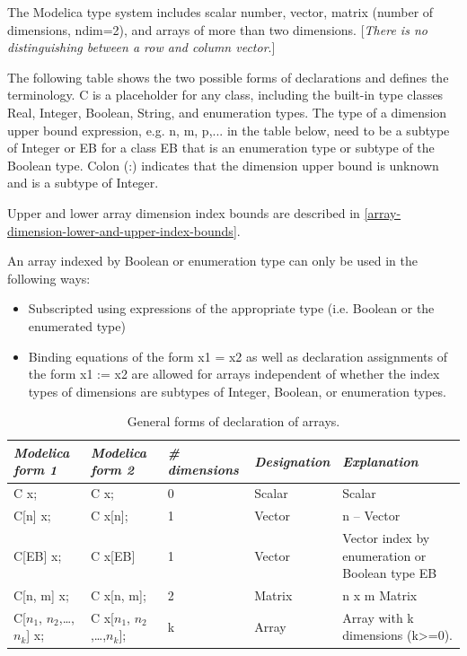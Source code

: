 \documentclass[10pt,a4paper]{report}
\begin{document}
The Modelica type system includes scalar number, vector, matrix (number
of dimensions, ndim=2), and arrays of more than two dimensions.
{[}\emph{There is no distinguishing between a row and column vector}.{]}

The following table shows the two possible forms of declarations and
defines the terminology. C is a placeholder for any class, including the
built-in type classes Real, Integer, Boolean, String, and enumeration
types. The type of a dimension upper bound expression, e.g. n, m, p,...
in the table below, need to be a subtype of Integer or EB for a class EB
that is an enumeration type or subtype of the Boolean type. Colon (:)
indicates that the dimension upper bound is unknown and is a subtype of
Integer.

Upper and lower array dimension index bounds are described in \ref{array-dimension-lower-and-upper-index-bounds}.

An array indexed by Boolean or enumeration type can only be used in the
following ways:

\begin{itemize}
\item
  Subscripted using expressions of the appropriate type (i.e. Boolean or
  the enumerated type)
\item
  Binding equations of the form x1 = x2 as well as declaration
  assignments of the form x1 := x2 are allowed for arrays independent of
  whether the index types of dimensions are subtypes of Integer,
  Boolean, or enumeration types.
\end{itemize}

\begin{longtable}{|l|l|l|l|p{3cm}|}
\caption{General forms of declaration of arrays.}\\
\hline
\emph{Modelica form 1} & \emph{Modelica form 2} & \emph{\# dimensions} &
\emph{Designation} & \emph{Explanation}\\ \hline
\endhead
C x; & C x; & 0 & Scalar & Scalar\\ \hline
C{[}n{]} x; & C x{[}n{]}; & 1 & Vector & n -- Vector\\ \hline
C{[}EB{]} x; & C x{[}EB{]} & 1 & Vector & Vector index by enumeration or
Boolean type EB\\ \hline
C{[}n, m{]} x; & C x{[}n, m{]}; & 2 & Matrix & n x m
Matrix\\ \hline
C{[}$n_1$, $n_{2}$,\ldots{},$n_k${]} x; & C x{[}$n_1$, $n_2$,\ldots{},$n_k${]}; & k & Array & Array with k dimensions
(k\textgreater{}=0).\\ \hline
\end{longtable}
\end{document}
